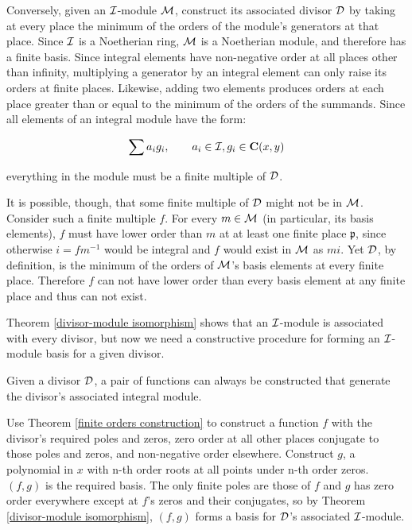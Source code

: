 Conversely, given an ${\cal I}$-module ${\cal M}$, construct its
associated divisor ${\cal D}$ by taking at every place the minimum of
the orders of the module's generators at that place.  Since ${\cal I}$
is a Noetherian ring, ${\cal M}$ is a Noetherian module, and therefore
has a finite basis.  Since integral elements have non-negative
order at all places other than infinity, multiplying a generator by an
integral element can only raise its orders at finite places.
Likewise, adding two elements produces orders at each place greater
than or equal to the minimum of the orders of the summands.  Since all
elements of an integral module have the form:

	$$\sum a_i g_i, \qquad a_i \in {\cal I}, g_i \in {\bf C}(x,y)$$

everything in the module must be a finite multiple of ${\cal D}$.

It is possible, though, that some finite multiple of ${\cal D}$ might
not be in ${\cal M}$.  Consider such a finite multiple $f$.  For every
$m \in {\cal M}$ (in particular, its basis elements), $f$ must have
lower order than $m$ at at least one finite place $\mathfrak{p}$,
since otherwise $i = fm^{-1}$ would be integral and $f$ would exist in
${\cal M}$ as $mi$.  Yet ${\cal D}$, by definition, is the minimum of
the orders of ${\cal M}$'s basis elements at every finite place.
Therefore $f$ can not have lower order than every basis element at any
finite place and thus can not exist.

\endtheorem

Theorem \ref{divisor-module isomorphism} shows that an
${\cal I}$-module is associated with every divisor, but
now we need a constructive procedure for forming an ${\cal I}$-module
basis for a given divisor.

\theorem
\label{divisor basis construction}

Given a divisor ${\cal D}$, a pair of functions can always be
constructed that generate the divisor's associated integral module.

\proof

Use Theorem \ref{finite orders construction} to construct a function
$f$ with the divisor's required poles and zeros, zero order at all
other places conjugate to those poles and zeros, and non-negative
order elsewhere.  Construct $g$, a polynomial in $x$ with n-th order
roots at all points under n-th order zeros.  $(f,g)$ is the required
basis.  The only finite poles are those of $f$ and $g$ has zero order
everywhere except at $f$'s zeros and their conjugates, so by Theorem
\ref{divisor-module isomorphism}, $(f,g)$ forms a basis for
${\cal D}$'s associated ${\cal I}$-module.

